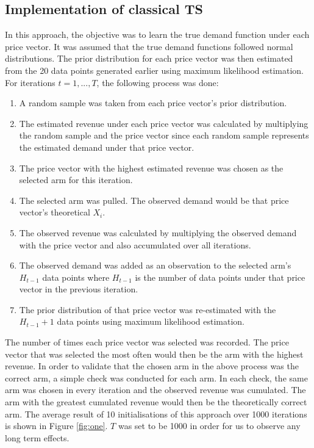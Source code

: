 \documentclass[a4paper]{article}
\begin{document}
\subsection{Implementation of classical TS}
In this approach, the objective was to learn the true demand function under each price vector. It was assumed that the true demand functions followed normal distributions. The prior distribution for each price vector was then estimated from the 20 data points generated earlier using maximum likelihood estimation. 
\newline
\newline
For iterations $t = 1,...,T$, the following process was done:
\begin{enumerate}
	\item A random sample was taken from each price vector's prior distribution.
	\item The estimated revenue under each price vector was calculated by multiplying the random sample and the price vector since each random sample represents the estimated demand under that price vector.
	\item The price vector with the highest estimated revenue was chosen as the selected arm for this iteration.
	\item The selected arm was pulled. The observed demand would be that price vector's theoretical $X_i$.
	\item The observed revenue was calculated by multiplying the observed demand with the price vector and also accumulated over all iterations.
	\item The observed demand was added as an observation to the selected arm's $H_{t-1}$ data points where $H_{t-1}$ is the number of data points under that price vector in the previous iteration.
	\item The prior distribution of that price vector was re-estimated with the $H_{t-1} + 1$ data points using maximum likelihood estimation.
\end{enumerate}
The number of times each price vector was selected was recorded. The price vector that was selected the most often would then be the arm with the highest revenue.
\newline
\newline
In order to validate that the chosen arm in the above process was the correct arm, a simple check was conducted for each arm. In each check, the same arm was chosen in every iteration and the observed revenue was cumulated. The arm with the greatest cumulated revenue would then be the theoretically correct arm. The average result of 10 initialisations of this approach over 1000 iterations is shown in Figure \ref{fig:one}. $T$ was set to be 1000 in order for us to observe any long term effects.
\end{document}
